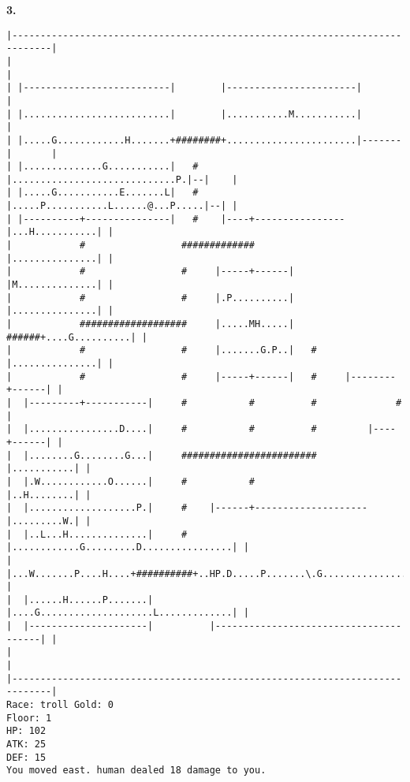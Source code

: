 \documentclass[11pt]{article}
\theoremstyle{plain}
\begin{document}
\newpage
\textbf{3. }
\begin{Verbatim}[fontsize=\scriptsize]
|-----------------------------------------------------------------------------|
|                                                                             |
| |--------------------------|        |-----------------------|               |
| |..........................|        |...........M...........|               |
| |.....G............H.......+########+.......................|-------|       |
| |..............G...........|   #    |.............................P.|--|    |
| |.....G...........E.......L|   #    |.....P...........L......@...P.....|--| |
| |----------+---------------|   #    |----+----------------|...H...........| |
|            #                 #############                |...............| |
|            #                 #     |-----+------|         |M..............| |
|            #                 #     |.P..........|         |...............| |
|            ###################     |.....MH.....|   ######+....G..........| |
|            #                 #     |.......G.P..|   #     |...............| |
|            #                 #     |-----+------|   #     |--------+------| |
|  |---------+-----------|     #           #          #              #        |
|  |................D....|     #           #          #         |----+------| |
|  |........G........G...|     ########################         |...........| |
|  |.W............O......|     #           #                    |..H........| |
|  |...................P.|     #    |------+--------------------|.........W.| |
|  |..L...H..............|     #    |............G.........D................| |
|  |...W.......P....H....+##########+..HP.D.....P.......\.G.................| |
|  |......H......P.......|          |....G....................L.............| |
|  |---------------------|          |---------------------------------------| |
|                                                                             |
|-----------------------------------------------------------------------------|
Race: troll Gold: 0                                                    Floor: 1
HP: 102
ATK: 25
DEF: 15
You moved east. human dealed 18 damage to you. 
\end{Verbatim}
\end{document}
